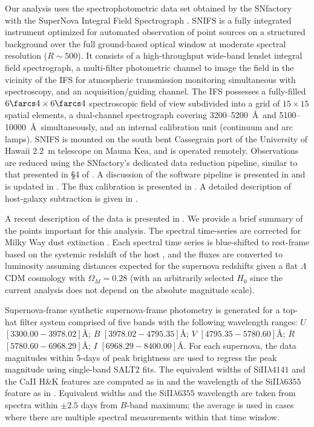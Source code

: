 \documentclass{aastex61}   	%
\begin{document}
Our analysis uses the spectrophotometric data set obtained by
the SNfactory with the SuperNova Integral Field
Spectrograph \citep[SNIFS,][]{2004SPIE.5249..146L}.  SNIFS is a fully integrated
instrument optimized for automated observation of point sources on a
structured background over the full ground-based optical window at
moderate spectral resolution ($R \sim 500$).  It consists of a
high-throughput wide-band lenslet integral field spectrograph, a
multi-filter photometric channel to image the field in the vicinity of
the IFS for atmospheric transmission monitoring simultaneous with
spectroscopy, and an acquisition/guiding channel.  The IFS possesses a
fully-filled $6\farcs 4 \times 6\farcs 4$ spectroscopic field of view
subdivided into a grid of $15 \times 15$ spatial elements, a
dual-channel spectrograph covering 3200--5200~\AA\ and 5100--10000~\AA\
simultaneously, and an internal calibration unit (continuum and arc
lamps).  SNIFS is mounted on the south bent Cassegrain port of the
University of Hawaii 2.2~m telescope on Mauna Kea, and is operated
remotely.  Observations are reduced using the SNfactory's dedicated data
reduction pipeline, similar to that presented in \S4 of \citet{2001MNRAS.326...23B}.
A discussion of the software pipeline is presented in
\citet{2006ApJ...650..510A} and is updated in \citet{2010ApJ...713.1073S}. 
The flux calibration is presented in \citet{2013A&A...549A...8B}.
A detailed
description of host-galaxy subtraction is given in \citet{2011MNRAS.418..258B}.

A recent description of the data is presented in \citet{2015ApJ...815...58F}.
We provide a brief summary of the points important for this analysis.
The spectral time-series  are corrected for Milky Way dust
extinction \citep{1989ApJ...345..245C,1998ApJ...500..525S}.  
Each spectral time series is
blue-shifted to rest-frame
based on the systemic redshift of the host \citep[c.f.][]{2013ApJ...770..107C}, and the fluxes are converted to luminosity assuming
distances expected for the supernova redshifts given a flat
$\Lambda$CDM cosmology with $\Omega_M = 0.28$ (with an arbitrarily selected
$H_0$ since the current analysis does not depend on the absolute magnitude scale).

Supernova-frame synthetic supernova-frame photometry is generated for a top-hat filter system
comprised of five 
bands with the following wavelength ranges: $U$ $[3300.00 - 3978.02]$\AA;
$B$ $[3978.02-4795.35]$\AA;
$V$ $[4795.35-5780.60]$\AA;
$R$ $[5780.60-6968.29]$\AA;
$I$ $[6968.29-8400.00]$\AA.
For each supernova, the data magnitudes within 5-days of peak brightness are used to regress the peak magnitude
using single-band SALT2 fits.
The equivalent widths of SiII$\lambda 4141$ and the CaII H\&K features are computed as
in \citet{2008A&A...477..717B} and the 
wavelength of the SiII$\lambda 6355$ feature
as in \citet{chotard:thesis}.
Equivalent widths and the
SiII$\lambda 6355$ wavelength are taken from spectra  within $\pm 2.5$ days from $B$-band maximum;
the average is used  in cases where there are multiple spectral measurements within that time window.
\end{document}
